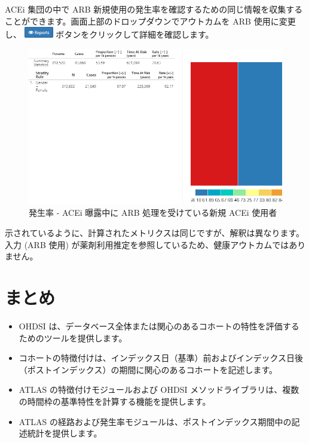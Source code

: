 \documentclass[
  11pt]{book}
\makeatletter
\newenvironment{kframe}{%
\medskip{}
\setlength{\fboxsep}{.8em}
 \def\at@end@of@kframe{}%
 \ifinner\ifhmode%
  \def\at@end@of@kframe{\end{minipage}}%
  \begin{minipage}{\columnwidth}%
 \fi\fi%
 \def\FrameCommand##1{\hskip\@totalleftmargin \hskip-\fboxsep
 \colorbox{myShadeColor}{##1}\hskip-\fboxsep
     \hskip-\linewidth \hskip-\@totalleftmargin \hskip\columnwidth}%
 \MakeFramed {\advance\hsize-\width
   \@totalleftmargin\z@ \linewidth\hsize
   \@setminipage}}%
 {\par\unskip\endMakeFramed%
 \at@end@of@kframe}
\newenvironment{rmdblock}[1]
  {
  \begin{itemize}
  \renewcommand{\labelitemi}{
    \raisebox{-.7\height}[0pt][0pt]{
      {\setkeys{Gin}{width=3em,keepaspectratio}\texttt{[image: images/\#1]}}
    }
  }
  \setlength{\fboxsep}{1em}
  \begin{kframe}
  \item
  }
  {
  \end{kframe}
  \end{itemize}
  }
\newenvironment{rmdsummary}
  {\begin{rmdblock}{summary}}
  {\end{rmdblock}}
\theoremstyle{definition}
\theoremstyle{definition}
\theoremstyle{definition}
\theoremstyle{definition}
\theoremstyle{remark}
\makeatother
\begin{document}
ACEi 集団の中で ARB 新規使用の発生率を確認するための同じ情報を収集することができます。画面上部のドロップダウンでアウトカムを ARB 使用に変更し、 \includegraphics{images/Characterization/atlasIncidenceReportButton.png} ボタンをクリックして詳細を確認します。

\begin{figure}

{\centering \includegraphics[width=1\linewidth]{images/Characterization/atlasIncidenceResultsARB} 

}

\caption{発生率 - ACEi 曝露中に ARB 処理を受けている新規 ACEi 使用者}\label{fig:atlasIncidenceResultsARB}
\end{figure}

示されているように、計算されたメトリクスは同じですが、解釈は異なります。入力 (ARB 使用) が薬剤利用推定を参照しているため、健康アウトカムではありません。

\section{まとめ}\label{ux307eux3068ux3081-8}

\begin{rmdsummary}
\begin{itemize}
\item
  OHDSI は、データベース全体または関心のあるコホートの特性を評価するためのツールを提供します。
\item
  コホートの特徴付けは、インデックス日（基準）前およびインデックス日後（ポストインデックス）の期間に関心のあるコホートを記述します。
\item
  ATLAS の特徴付けモジュールおよび OHDSI メソッドライブラリは、複数の時間枠の基準特性を計算する機能を提供します。
\item
  ATLAS の経路および発生率モジュールは、ポストインデックス期間中の記述統計を提供します。
\end{itemize}
\end{rmdsummary}
\end{document}
